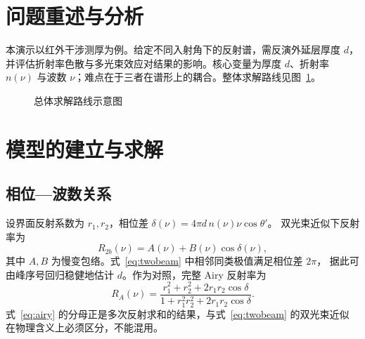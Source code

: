 
\section{问题重述与分析}
本演示以红外干涉测厚为例。给定不同入射角下的反射谱，需反演外延层厚度 $d$，
并评估折射率色散与多光束效应对结果的影响。核心变量为厚度 $d$、折射率 $n(\nu)$
与波数 $\nu$；难点在于三者在谱形上的耦合。整体求解路线见图~\ref{fig:roadmap}。

\begin{figure}[htbp]
  \centering
  \caption{总体求解路线示意图}
  \label{fig:roadmap}
\end{figure}

\section{模型的建立与求解}

\subsection{相位—波数关系}
设界面反射系数为 $r_1,r_2$，相位差 $\delta(\nu)=4\pi d\, n(\nu)\nu\cos\theta'$。
双光束近似下反射率为
\begin{equation}
  R_{2b}(\nu)=A(\nu)+B(\nu)\cos\delta(\nu),
  \label{eq:twobeam}
\end{equation}
其中 $A,B$ 为慢变包络。式~\eqref{eq:twobeam} 中相邻同类极值满足相位差 $2\pi$，
据此可由峰序号回归稳健地估计 $d$。作为对照，完整 Airy 反射率为
\begin{equation}
  R_{A}(\nu)=\frac{r_1^2+r_2^2+2r_1r_2\cos\delta}{1+r_1^2r_2^2+2r_1r_2\cos\delta}.
  \label{eq:airy}
\end{equation}
式~\eqref{eq:airy} 的分母正是多次反射求和的结果，与式~\eqref{eq:twobeam} 的双光束近似
在物理含义上必须区分，不能混用。

